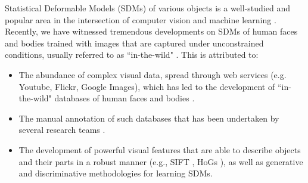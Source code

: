 Statistical Deformable Models (SDMs) of various objects is a well-studied and popular area in the intersection of computer vision and machine learning \cite{Cootes1995, Cootes2001, Matthews2004, Saragih2011, Belhumeur2011, Zhu2012, Xiong2013}. Recently, we have witnessed tremendous developments on SDMs of human faces and bodies trained with images that are captured under unconstrained conditions, usually referred to as ``in-the-wild" \cite{Belhumeur2011, Cao2012, Zhu2012, Xiong2013, Asthana2013, Tzimiropoulos2014, Asthana2014, kazemi2014one, Alabort2014, zhu2015face, antonakos2015feature, antonakos2015active, Joan_cvpr2015, tzimiropoulos2015project}. This is attributed to:
\begin{itemize}
\item The abundance of complex visual data, spread through web services (e.g. Youtube, Flickr, Google Images), which has led to the development of ``in-the-wild" databases of human faces and bodies \cite{Belhumeur2011, Le2012, Zhu2012, Burgos2013}.

\item The manual annotation of such databases that has been undertaken by several research teams \cite{sagonas_iccv_300w_2013,sagonas2016faces,charles2013domain,dantone2014body,andriluka14cvpr}.

\item The development of powerful visual features that are able to describe objects and their parts in a robust manner (e.g., SIFT \cite{lowe1999object}, HoGs \cite{Dalal2005}
), as well as generative and discriminative methodologies for learning SDMs.
\end{itemize}

